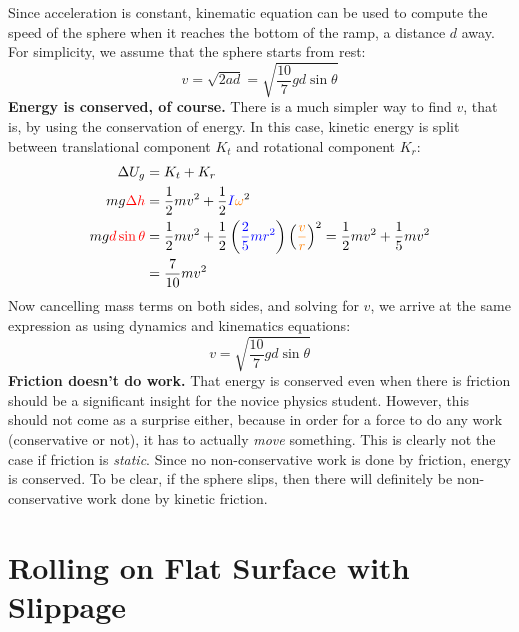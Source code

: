 \documentclass{../../../oss-handout}
\begin{document}
Since acceleration is constant, kinematic equation can be used to compute the
speed of the sphere when it reaches the bottom of the ramp, a distance $d$ away.
For simplicity, we assume that the sphere starts from rest:
\begin{equation}
  v=\sqrt{2ad}=\sqrt{\frac{10}{7}gd\sin\theta}
\end{equation}
\textbf{Energy is conserved, of course.} There is a much simpler way to find
$v$, that is, by using the conservation of energy. In this case, kinetic energy
is split between translational component $K_t$ and rotational component $K_r$:
\begin{align*}
  \Delta U_g&=K_t+K_r\\
  mg\textcolor{red}{\Delta h}&=\frac12 mv^2+
  \frac12
  \textcolor{blue}{I}\textcolor{orange}{\omega}^2\\
  mg\textcolor{red}{d\sin\theta}&=\frac12 mv^2+\frac12
  \left(\textcolor{blue}{\frac25 mr^2}\right)
  \left(\textcolor{orange}{\frac{v}{r}}\right)^2
  =\frac12 mv^2+\frac15mv^2\\
  &=\frac{7}{10}mv^2
\end{align*}
Now cancelling mass terms on both sides, and solving for $v$, we arrive at the
same expression as using dynamics and kinematics equations:
\begin{equation}
  v=\sqrt{\frac{10}{7}gd\sin\theta}
\end{equation}
\textbf{Friction doesn't do work.} That energy is conserved even when there is
friction should be a significant insight for the novice physics student.
However, this should not come as a surprise either, because in order for a
force to do any work (conservative or not), it has to actually \emph{move}
something. This is clearly not the case if friction is \emph{static}. Since no
non-conservative work is done by friction, energy is conserved. To be clear, if
the sphere slips, then there will definitely be non-conservative work done by
kinetic friction.

\section{Rolling on Flat Surface with Slippage}
\end{document}

